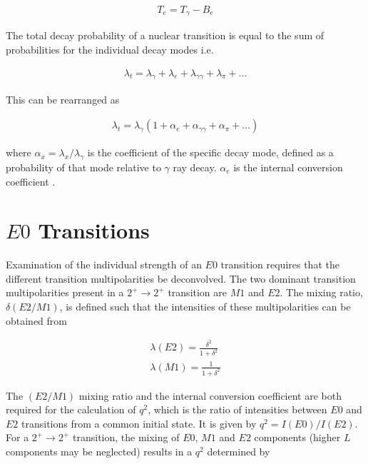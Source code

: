 \begin{gather}
T_e = T_\gamma - B_e
\label{equation: icc conservation of energy}
\end{gather}

The total decay probability of a nuclear transition is equal to the sum of probabilities for the individual decay modes i.e.

\begin{gather}
\lambda_t = \lambda_\gamma + \lambda_e + \lambda_{\gamma \gamma} + \lambda_\pi +...
\label{equation: total decay as constituent sum}
\end{gather}

This can be rearranged as

\begin{gather}
\lambda_t = \lambda_\gamma(1+\alpha_e+\alpha_{\gamma \gamma}+ \alpha_\pi+...)
\label{equation: re-arrange to define alpha icc}
\end{gather}

where $\alpha_x=\lambda_x/\lambda_\gamma$ is the coefficient of the specific decay mode, defined as a probability of that mode relative to $\gamma$ ray decay. $\alpha_e$ is the internal conversion coefficient \cite{KraneText}.

\section{$E0$ Transitions}

Examination of the individual strength of an $E0$ transition requires that the different transition multipolarities be deconvolved. The two dominant transition multipolarities present in a $2^+ \rightarrow 2^+$ transition are $M1$ and $E2$. The mixing ratio, $\delta(E2/M1)$, is defined such that the intensities of these multipolarities can be obtained from 

\begin{gather}
\lambda(E2) = \frac{\delta^2}{1+\delta^2} \\
\lambda(M1) = \frac{1}{1+\delta^2}
\label{equation: disambiguating the mixing ratio}
\end{gather} 

The $(E2/M1)$ mixing ratio and the internal conversion coefficient are both required for the calculation of $q^2$, which is the ratio of intensities between $E0$ and $E2$ transitions from a common initial state. It is given by $q^2 = I(E0)/I(E2)$. For a $2^+\rightarrow2^+$ transition, the mixing of $E0$, $M1$ and $E2$ components (higher $L$ components may be neglected) results in a $q^2$ determined by

